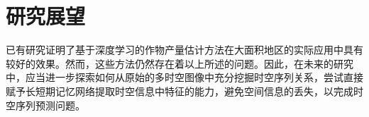 \section{研究展望}

\par 已有研究证明了基于深度学习的作物产量估计方法在大面积地区的实际应用中具有较好的效果。然而，这些方法仍然存在着以上所述的问题。因此，在未来的研究中，应当进一步探索如何从原始的多时空图像中充分挖掘时空序列关系，尝试直接赋予长短期记忆网络提取时空信息中特征的能力，避免空间信息的丢失，以完成时空序列预测问题。

\newpage
\begingroup
    \printbibliography[title={参考文献}]
\endgroup
